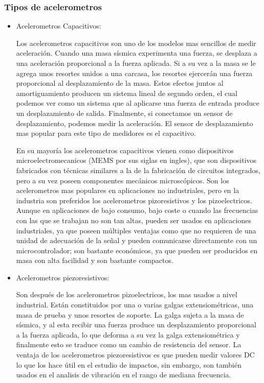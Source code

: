 \subsubsection*{Tipos de acelerometros}


\begin{itemize}
    \item  Acelerometros Capacitivos:

Los acelerometros capacitivos son uno de los modelos mas sencillos de medir
aceleración. Cuando una masa sísmica experimenta una fuerza, se desplaza a una
aceleración proporcional a la fuerza aplicada. Si a su vez a la masa se le
agrega unos resortes unidos a una carcasa, los resortes ejercerán una fuerza
proporcional al desplazamiento de la masa. Estos efectos juntos al
amortiguamiento producen un sistema lineal de segundo orden, el cual podemos
ver como un sistema que al aplicarse una fuerza de entrada produce un
desplazamiento de salida. Finalmente, si conectamos un sensor de
desplazamiento, podemos medir la aceleración. El sensor de desplazamiento mas
popular para este tipo de medidores es el capacitivo.



En su mayoría los acelerometros capacitivos vienen como dispositivos
microelectromecanicos (MEMS por sus siglas en ingles), que son dispositivos
fabricados con técnicas similares a la de la fabricación de circuitos
integrados, pero a su vez poseen componentes mecánicos microscópicos. Son los
acelerometros mas populares en aplicaciones no industriales, pero en la
industria son preferidos los acelerometros pizoresistivos y los pizoelectricos.
Aunque en aplicaciones de bajo consumo, bajo coste o cuando las frecuencias con
las que se trabajan no son tan altas, pueden ser usados en aplicaciones
industriales, ya que poseen múltiples ventajas como que no requieren de una
unidad de adecuación de la señal y pueden comunicarse directamente con un
microcontrolador; son bastante económicos, ya que pueden ser producidos en
masa con alta facilidad y son bastante compactos.



\item  Acelerometros piezoresistivos:

Son después de los acelerometros pizoelectricos, los mas usados a nivel
industrial. Están constituidos por una o varias galgas extensiométricas, una
masa de prueba y unos resortes de soporte. La galga sujeta a la masa de
sísmica, y al esta recibir una fuerza produce un desplazamiento proporcional a
la fuerza aplicada, lo que deforma a su vez la galga extensiométrica y
finalmente esto se traduce como un cambio de resistencia del sensor. La ventaja
de los acelerometros piezoresistivos es que pueden medir valores DC lo que los
hace útil en el estudio de impactos, sin embargo, son también usados en el
analisis de vibración en el rango de mediana frecuencia.


\end{itemize}
